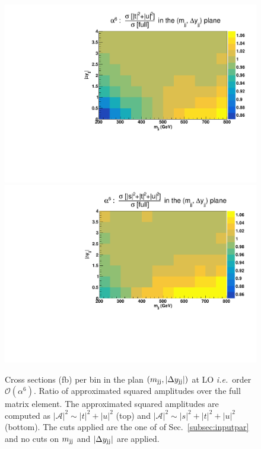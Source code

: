 \begin{figure}[hbt]
\centering
\includegraphics[scale=0.395]{figures/scanfigures/ratio_tu.pdf}
\includegraphics[scale=0.395]{figures/scanfigures/ratio_stu.pdf}
\caption{Cross sections (fb) per bin in the plan $\left(m_{\text{j}\text{j}}, |\Delta y_{\text{j}\text{j}}| \right)$ at LO \emph{i.e.}\ order $\mathcal{O}(\alpha^6)$.
Ratio of approximated squared amplitudes over the full matrix element.
The approximated squared amplitudes are computed as $|\mathcal{A}|^2 \sim |t|^2 + |u|^2$ (top) and $|\mathcal{A}|^2 \sim |s|^2 + |t|^2 + |u|^2$ (bottom).
The cuts applied are the one of of Sec.~\ref{subsec:inputpar} and no cuts on $m_{\text{j}\text{j}}$ and $|\Delta y_{\text{j}\text{j}}|$ are applied.} 
\label{fig:ratio2d_LO}
\end{figure}

